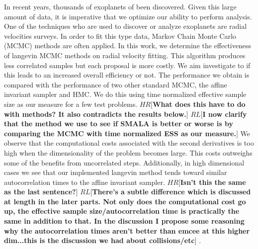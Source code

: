 \documentclass{aa}
\def\memohr#1{\color{blue}$HR[${\bf #1}$]$ \color{black}}
\def\memorl#1{\color{gray}$RL[${\bf #1}$]$ \color{black}}
\begin{document}
  \abstract
   {In recent years, thousands of exoplanets of been discovered. 
Given this large amount of data, it is imperative that we optimize our ability to perform analysis. 
One of the techniques who are used to discover or analyze exoplanets are radial velocities surveys. 
In order to fit this type data, Markov Chain Monte Carlo (MCMC) methods are often applied.}
   {In this work, we determine the effectiveness of langevin MCMC methods on radial velocity fitting. 
This algorithm produces less correlated samples but each proposal is more costly. 
We aim investigate to if this leads to an increased overall efficiency or not.}
   {The performance we obtain is compared with the performance of two other standard MCMC, the affine invariant sampler and HMC.
We do this using time normalized effective sample size as our measure for a few test problems. 
\memohr{What does this have to do with methods? It also contradicts the results below.}
\memorl{I now clarify that the method we use to see if SMALA is better or worse is by comparing the MCMC with time normalized ESS as our measure.}
}
   {We observe that the computational costs associated with the second derivatives is too high when the dimensionality of the problem becomes large.
This costs outweighs some of the benefits from uncorrelated steps. Additionally, in high dimensional cases we see that our implemented langevin method tends toward similar autocorrelation times to the affine invariant sampler.
\memohr{Isn't this the same as the last sentence?}
\memorl{There's a subtle difference which is discussed at length in the later parts. Not only does the computational cost go up, the effective sample size/autocorrelation time is practically the same in addition to that. In the discussion I propose some reasoning why the autocorrelation times aren't better than emcee at this higher dim...this is the discussion we had about collisions/etc}.
}
   {}


   \maketitle
%
\end{document}
